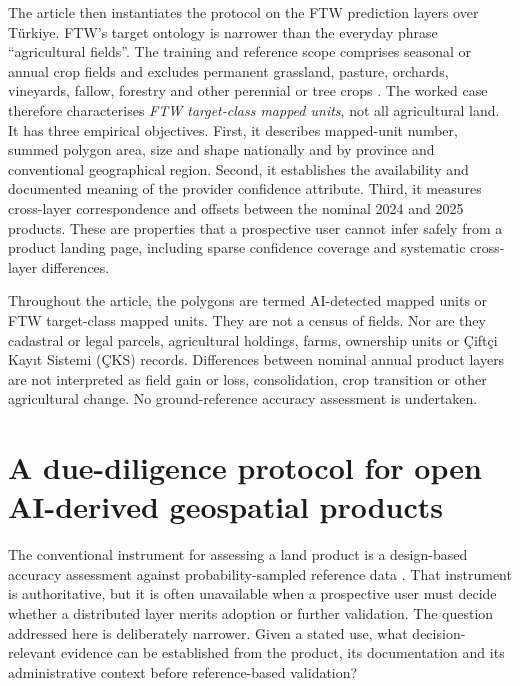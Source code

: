 \documentclass[pdflatex,sn-basic]{sn-jnl}
\begin{document}
The article then instantiates the protocol on the FTW prediction layers over Türkiye. FTW's target ontology is narrower than the everyday phrase ``agricultural fields''. The training and reference scope comprises seasonal or annual crop fields and excludes permanent grassland, pasture, orchards, vineyards, fallow, forestry and other perennial or tree crops \citep{kerner_fields_2025,robinson_first_2026}. The worked case therefore characterises \emph{FTW target-class mapped units}, not all agricultural land. It has three empirical objectives. First, it describes mapped-unit number, summed polygon area, size and shape nationally and by province and conventional geographical region. Second, it establishes the availability and documented meaning of the provider confidence attribute. Third, it measures cross-layer correspondence and offsets between the nominal 2024 and 2025 products. These are properties that a prospective user cannot infer safely from a product landing page, including sparse confidence coverage and systematic cross-layer differences.

Throughout the article, the polygons are termed AI-detected mapped units or FTW target-class mapped units. They are not a census of fields. Nor are they cadastral or legal parcels, agricultural holdings, farms, ownership units or Çiftçi Kayıt Sistemi (ÇKS) records. Differences between nominal annual product layers are not interpreted as field gain or loss, consolidation, crop transition or other agricultural change. No ground-reference accuracy assessment is undertaken.

\section{A due-diligence protocol for open AI-derived geospatial products}\label{sec:protocol}

The conventional instrument for assessing a land product is a design-based accuracy assessment against probability-sampled reference data \citep{olofsson_good_2014,stehman_key_2019}. That instrument is authoritative, but it is often unavailable when a prospective user must decide whether a distributed layer merits adoption or further validation. The question addressed here is deliberately narrower. Given a stated use, what decision-relevant evidence can be established from the product, its documentation and its administrative context before reference-based validation?
\end{document}
